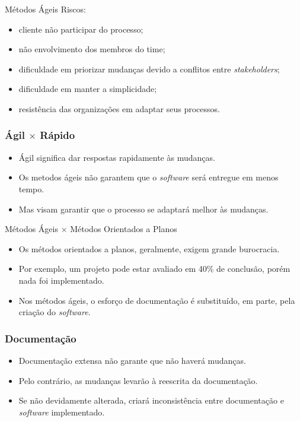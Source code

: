 \documentclass[11pt]{beamer}
\begin{document}
    \begin{frame}{Métodos Ágeis}
      Riscos:
      \begin{itemize}
         \item cliente não participar do processo;
         \item não envolvimento dos membros do time;
         \item dificuldade em priorizar mudanças devido a conflitos entre \textit{stakeholders};
         \item dificuldade em manter a simplicidade;
         \item resistência das organizações em adaptar seus processos.
      \end{itemize}
    \end{frame}

    \begin{frame}
      \frametitle{Ágil $\times$ Rápido}
      \begin{itemize}
         \item Ágil significa dar respostas rapidamente às mudanças.
         \item Os metodos ágeis não garantem que o \textit{software} será entregue em menos tempo.
         \item Mas visam garantir que o processo se adaptará melhor às mudanças. 
      \end{itemize}
    \end{frame}

    \begin{frame}{Métodos Ágeis $\times$ Métodos Orientados a Planos}
      \begin{itemize}
         \item Os métodos orientados a planos, geralmente, exigem grande burocracia.
         \item Por exemplo, um projeto pode estar avaliado em 40\% de conclusão, porém nada foi implementado.
         \item Nos métodos ágeis, o esforço de documentação é substituído, em parte, pela criação do \textit{software}.
      \end{itemize}
    \end{frame}

    \begin{frame}
      \frametitle{Documentação}
      \begin{itemize}
         \item Documentação extensa não garante que não haverá mudanças.
         \item Pelo contrário, as mudanças levarão à reescrita da documentação.
         \item Se não devidamente alterada, criará inconsistência entre documentação e \textit{software} implementado.
      \end{itemize}
    \end{frame}
\end{document}

